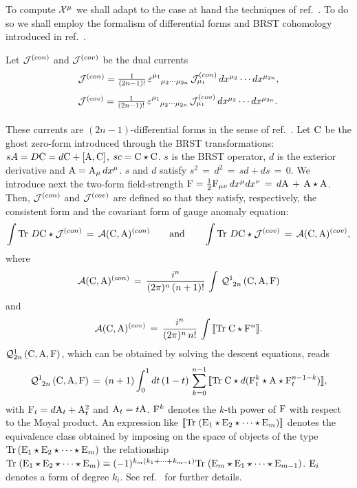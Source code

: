 \documentclass[a4paper,12pt]{article}
\def\cA{{\cal A}}
\def\cJ{{\cal J}}
\def\cQ{{\cal Q}}
\def\cX{{\cal X}}
\def\A{{\rm A}}
\def\C{{\rm C}}
\def\E{{\rm E}}
\def\F{{\rm F}}
\def\bracl{ [\!\!\, [}
\def\bracr{ ]\!\!\, ]}
\begin{document}
  To compute $\cX^{\mu}$ we shall adapt to the 
case at hand the techniques of ref.~\cite{Alvarez-Gaume:1985dr}. To do so we 
shall employ the  formalism of differential forms and BRST cohomology 
introduced  in ref.~\cite{Bonora:2000he}. 

Let $\cJ^{(con)}$ and  $\cJ^{(cov)}$   be the dual 
currents         
\begin{equation}
\begin{array}{l} 
{\cJ^{(con)}=\frac{1}{(2n-1)!}\,
\varepsilon^{\mu_1}_{\phantom{\mu_1}\mu_2\cdots\mu_{2n}}\,
\cJ_{\mu_1}^{(con)}\,dx^{\mu_2}\cdots dx^{\mu_{2n}},}\\[9pt]
{\cJ^{(cov)}=\frac{1}{(2n-1)!}\,
\varepsilon^{\mu_1}_{\phantom{\mu_1}\mu_2\cdots\mu_{2n}}\,
\cJ_{\mu_1}^{(cov)}\,dx^{\mu_2}\cdots dx^{\mu_{2n}}.}\\[9pt]
\end{array}
\label{dualcurrents}
\end{equation}
These currents are $(2n-1)$-differential forms in the sense of  
ref.~\cite{Bonora:2000he}. Let
$\C$ be the ghost zero-form introduced through the BRST transformations:
$sA=D\C=d\C+[\A,\C]$, $sc=\C\star\C$. $s$ is the BRST operator,  
$d$ is the exterior derivative and $\A=\A_{\mu}\,dx^{\mu}$. $s$ and $d$ 
satisfy $s^2\,=\,d^2\,=\,sd+ds\,=\,0$.
We  introduce next the two-form field-strength    
$\F=\frac{1}{2}\F_{\mu\nu}\,dx^{\mu}dx^{\nu}\,=\,d\A\,+\,\A\star\A$.
Then, $\cJ^{(con)}$ and $\cJ^{(cov)}$ are defined so that they 
satisfy, respectively, the consistent form and the covariant form
of gauge anomaly equation:
\begin{equation}
\int {\rm Tr}\ D\C\star\cJ^{(con)}\,=\,\cA(\C,\A)^{(con)}\qquad
\mbox{\rm  and}\qquad
\int {\rm Tr}\ D\C\star\cJ^{(cov)}\,=\,\cA(\C,\A)^{(cov)},
\label{anomalyindifforms}
\end{equation}
where
\begin{equation}
\cA(\C,\A)^{(con)}\,=\,\frac{i^n}{(2\pi)^n\,(n+1)!}\,\int\, \cQ^{1}_{\;\,2n}
\,(\C,\A,\F)
\label{conform}
\end{equation}
and 
\begin{equation}
\cA(\C,\A)^{(cov)}\,=\,\frac{i^n}{(2\pi)^n\,n!}\,\int\,
\bracl{\rm Tr}\;\C\star \F^n\bracr.
\label{covform}
\end{equation}
$\cQ^{1}_{2n}\,(\C,\A,\F)$, which can be obtained by solving the descent 
equations, reads  
\begin{equation}
\cQ^{1}_{\;\,2n}\,(\C,\A,\F)\,=\,
(n+1)\int_{0}^{1}dt\,(1-t)\,\sum_{k=0}^{n-1}\,\bracl{\rm Tr}\;
\C\star d(\F_t^{k}\star\A\star \F_t^{n-1-k})\bracr,
\label{Qform}
\end{equation}
with $\F_t=d\A_t+\A_t^2$ and $\A_t=t\A$. 
$\F^k$ denotes the $k$-th power of $\F$ with respect to the Moyal product. 
An expression like $\bracl
{\rm Tr}\;( \E_1 \star\E_2\star\cdots\star\E_m)\bracr$ denotes
the equivalence class obtained by imposing on the space of objects of the type 
${\rm Tr}\,( \E_1 \star\E_2\star\cdots\star\E_m)$ the relationship 
${\rm Tr}\;( \E_1 \star\E_2\star\cdots\star\E_m)\equiv 
(-1)^{k_m(k_1+\cdots+k_{m-1})}
{\rm Tr}\;( \E_m \star\E_1\star\cdots\star\E_{m-1})$. 
$\E_i$ denotes a form of degree  $k_i$. See ref.~\cite{Bonora:2000he} for 
further details. 
\end{document}
